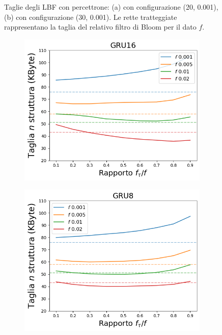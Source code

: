 \documentclass[../../main.tex]{subfiles}
\begin{document}
\begin{figure}[H]
\begin{subfigure}[b]{0.49\textwidth}
            \caption{}
            \label{fig:LBFTagliaPercettrone30}
        \end{subfigure}
        \caption{Taglie degli LBF con percettrone: (a) con configurazione (20, 0.001), (b) con configurazione (30, 0.001). Le rette tratteggiate rappresentano la taglia del relativo filtro di Bloom per il dato $f$.}
        \label{fig:tagliePercettroniLBF}
    \end{figure}

    \begin{figure}[H]
        \centering
        \begin{subfigure}[b]{0.49\textwidth}
            \centering
            \includegraphics[width = \textwidth]{immagini/7/LBF/GRU16_Taglia.png}
            \caption{}
            \label{fig:LBFTagliaGRU16}
        \end{subfigure}
        \begin{subfigure}[b]{0.49\textwidth}
            \centering
            \includegraphics[width = \textwidth]{immagini/7/LBF/GRU8_Taglia.png}

\end{subfigure}
\end{figure}
\end{document}
